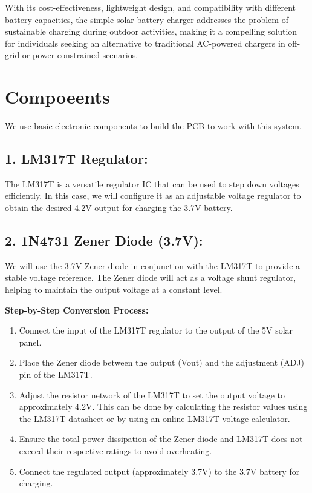 \documentclass[twocolumn]{article}
\begin{document}
    \noindent With its cost-effectiveness, lightweight design, and compatibility with different battery capacities, the simple solar battery charger addresses the problem of sustainable charging during outdoor activities, making it a compelling solution for individuals seeking an alternative to traditional AC-powered chargers in off-grid or power-constrained scenarios.

\section*{Compoeents}
We use basic electronic components to build the PCB to work with this system.

\subsection*{1. LM317T Regulator:}

The LM317T is a versatile regulator IC that can be used to step down voltages efficiently. In this case, we will configure it as an adjustable voltage regulator to obtain the desired 4.2V output for charging the 3.7V battery.

\subsection*{2. 1N4731 Zener Diode (3.7V):}

We will use the 3.7V Zener diode in conjunction with the LM317T to provide a stable voltage reference. The Zener diode will act as a voltage shunt regulator, helping to maintain the output voltage at a constant level.
\vspace{10pt}

\noindent \textbf{ Step-by-Step Conversion Process:}
\vspace{5pt}

\begin{enumerate}
    \item Connect the input of the LM317T regulator to the output of the 5V solar panel.
    
    \item Place the Zener diode between the output (Vout) and the adjustment (ADJ) pin of the LM317T.
    
    \item Adjust the resistor network of the LM317T to set the output voltage to approximately 4.2V. This can be done by calculating the resistor values using the LM317T datasheet or by using an online LM317T voltage calculator.
    
    \item Ensure the total power dissipation of the Zener diode and LM317T does not exceed their respective ratings to avoid overheating.
    
    \item Connect the regulated output (approximately 3.7V) to the 3.7V battery for charging.
\end{enumerate}
\end{document}
